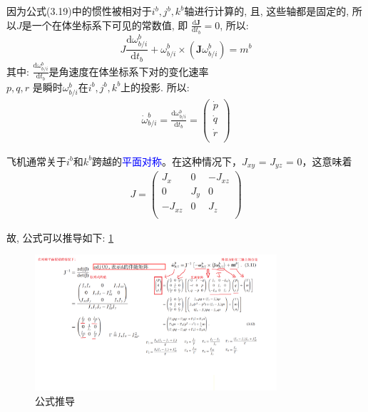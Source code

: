 \documentclass[UTF8,a4paper,10pt,nocolorlinks]{ctexart}
\begin{document}
因为公式(3.19)中的惯性被相对于$i^{b}, j^{b}, k^{b}$轴进行计算的, 且, 这些轴都是固定的, 所以$J$是一个在体坐标系下可见的常数值, 即 $\frac{\mathrm{d} \textbf{J} }{\mathrm{d} t_{b}} = 0$,
所以: 
\begin{equation}
  J \frac{\mathrm{d} \omega_{b / i}^b}{\mathrm{d} t_{b}} + \omega_{b / i} ^ {b} \times (\textbf{J} \omega_{b / i} ^ {b}) = m^{b}
\end{equation}
其中: $\frac{\mathrm{d} \omega_{b / i}^b}{\mathrm{d} t_{b}} $是角速度在体坐标系下对的变化速率
\\ $p, q, r$ 是瞬时$\omega_{b/i}^{b}$在$i^{b}, j^{b}, k^{b}$上的投影. 
所以:
\begin{gather*} %
  \dot{\omega}_{b/i}^{b} = \frac{\mathrm{d} \omega_{b/i}^{b}}{\mathrm{d} t_{b}} =  \begin{pmatrix}
      \dot{p} \\
      \dot{q} \\
      \dot{r} \\
    \end{pmatrix}
\end{gather*}
\par
飞机通常关于$i^{b}$和$k^{b}$跨越的\textcolor{blue}{平面对称}。在这种情况下，$J_{xy}$ = $J_{yz}$ = 0，这意味着
\begin{gather*}
  J = 
  \begin{pmatrix}
    J_{x} & 0 & -J_{xz} \\
    0 & J_{y} & 0 \\
    -J_{xz} & 0 & J_{z} \\ 
  \end{pmatrix}
\end{gather*}

故, 公式可以推导如下: \ref{equ_6}
\begin{figure}[htpb]
  \centering
  \includegraphics[width=0.8\textwidth]{picture/equ_6.png}
  \caption{公式推导}
  \label{equ_6}
\end{figure}
\end{document}
